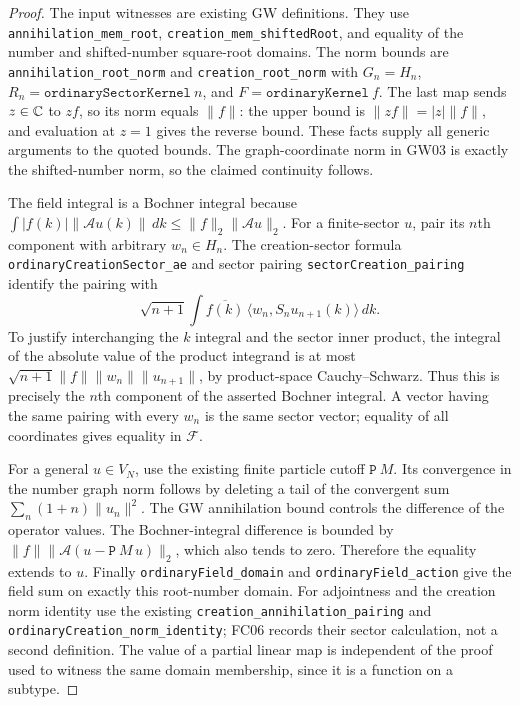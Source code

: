 \documentclass[11pt,a4paper]{article}
\theoremstyle{remark}\newtheorem{remark}[theorem]{Remark}
\newcommand{\F}{\mathcal F}\newcommand{\Q}{\mathcal Q}\newcommand{\HH}{\mathcal H}
\begin{document}
\begin{proof}
The input witnesses are existing GW definitions. They use \texttt{annihilation\_mem\_root}, \texttt{creation\_mem\_shiftedRoot}, and equality of the number and shifted-number square-root domains. The norm bounds are \texttt{annihilation\_root\_norm} and \texttt{creation\_root\_norm} with $G_n=H_n$, $R_n=\texttt{ordinarySectorKernel}\ n$, and $F=\texttt{ordinaryKernel}\ f$. The last map sends $z\in\mathbb C$ to $zf$, so its norm equals $\|f\|$: the upper bound is $\|zf\|=|z|\|f\|$, and evaluation at $z=1$ gives the reverse bound. These facts supply all generic arguments to the quoted bounds. The graph-coordinate norm in GW03 is exactly the shifted-number norm, so the claimed continuity follows.

The field integral is a Bochner integral because
$\int|f(k)|\|\mathcal Au(k)\|\,dk\leq\|f\|_2\|\mathcal Au\|_2$.
For a finite-sector $u$, pair its $n$th component with arbitrary $w_n\in H_n$. The creation-sector formula \texttt{ordinaryCreationSector\_ae} and sector pairing \texttt{sectorCreation\_pairing} identify the pairing with
\[
 \sqrt{n+1}\int\overline{f(k)}\,
      \langle w_n,S_nu_{n+1}(k)\rangle\,dk.
\]
To justify interchanging the $k$ integral and the sector inner product, the integral of the absolute value of the product integrand is at most
$\sqrt{n+1}\|f\|\|w_n\|\|u_{n+1}\|$, by product-space Cauchy--Schwarz. Thus this is precisely the $n$th component of the asserted Bochner integral. A vector having the same pairing with every $w_n$ is the same sector vector; equality of all coordinates gives equality in $\F$.

For a general $u\in V_N$, use the existing finite particle cutoff $\texttt{P}\ M$. Its convergence in the number graph norm follows by deleting a tail of the convergent sum $\sum_n(1+n)\|u_n\|^2$. The GW annihilation bound controls the difference of the operator values. The Bochner-integral difference is bounded by $\|f\|\|\mathcal A(u-\texttt{P}\ M\,u)\|_2$, which also tends to zero. Therefore the equality extends to $u$. Finally \texttt{ordinaryField\_domain} and \texttt{ordinaryField\_action} give the field sum on exactly this root-number domain. For adjointness and the creation norm identity use the existing \texttt{creation\_annihilation\_pairing} and \texttt{ordinaryCreation\_norm\_identity}; FC06 records their sector calculation, not a second definition. The value of a partial linear map is independent of the proof used to witness the same domain membership, since it is a function on a subtype.
\end{proof}
\end{document}
